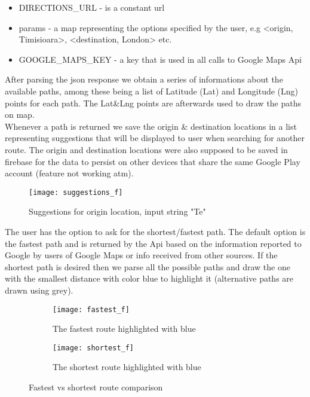 \documentclass[11,titlepage]{article}
\begin{document}
	\begin{itemize}
	
	\item DIRECTIONS\_URL - is  a constant url
	\item params - a map representing the options specified by the user, e.g <origin, Timisioara>, <destination, London> etc.
	\item GOOGLE\_MAPS\_KEY - a key that is used in all calls to Google Maps Api \\
	\end{itemize}
	
	After parsing the json response we obtain a series of informations about the available paths, among these being a list of Latitude (Lat) and Longitude (Lng) points for each path. The Lat\&Lng points are afterwards used to draw the paths on map.\\ 
	
	Whenever a path is returned we save the origin \& destination locations in a list representing suggestions that will be displayed to user when searching for another route. The origin and destination locations were also supposed to be saved in firebase for the data to persist on other devices that share the same Google Play account (feature not working atm).\\
	
	
	\begin{figure}[H]
		\begin{center}
		\texttt{[image: suggestions\_f]}
		\caption{Suggestions for origin location, input string "Te"}
		\end{center}
	\end{figure}
	
	The user has the option to ask for the shortest/fastest path. The default option is the fastest path and is returned by the Api based on the information reported to Google by users of Google Maps or info received from other sources. If the shortest path is desired then we parse all the possible paths and draw the one with the smallest distance with color blue to highlight it (alternative paths are drawn using grey).
	
\begin{figure}[H]
\centering
\begin{subfigure}{.5\textwidth}
  \centering
  \texttt{[image: fastest\_f]}
  \caption{The fastest route highlighted with blue}
  \label{fig:sub1}
\end{subfigure}%
\begin{subfigure}{.5\textwidth}
  \centering
  \texttt{[image: shortest\_f]}
  \caption{The shortest route highlighted with blue}
  \label{fig:sub2}
\end{subfigure}
\caption{Fastest vs shortest route comparison}
\label{fig:test}
\end{figure}
\end{document}
